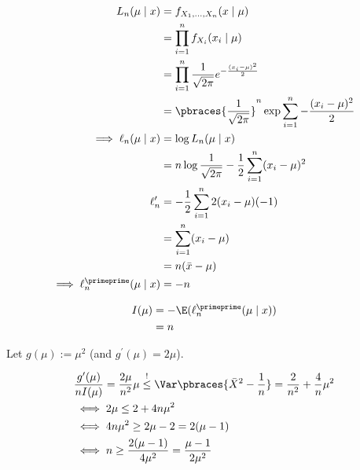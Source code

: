\begin{solution}
\begin{enumerate}[label = (\alph*)]
    \begin{align*}
        L_n(\mu \mid x)
        & =
        f_{X_1, \dots, X_n}(x \mid \mu) \\
        & =
        \prod_{i=1}^n f_{X_i}(x_i \mid \mu) \\
        & =
        \prod_{i=1}^n
            \frac{1}{\sqrt{2 \pi}}
            e^{-\frac{(x_i - \mu)^2}{2}} \\
        & =
        \pbraces
        {
            \frac{1}{\sqrt{2 \pi}}
        }^n
        \exp
            \sum_{i=1}^n
                -\frac{(x_i - \mu)^2}{2} \\
        \implies
        \ell_n(\mu \mid x)
        & =
        \log L_n(\mu \mid x) \\
        & =
        n \log \frac{1}{\sqrt{2 \pi}}
        -
        \frac{1}{2}
        \sum_{i=1}^n
            (x_i - \mu)^2 \\
        \ell_n^\prime
        & =
        -\frac{1}{2}
        \sum_{i=1}^n
            2 (x_i - \mu) (-1) \\
        & =
        \sum_{i=1}^n
            (x_i - \mu) \\
        & =
        n (\bar x - \mu) \\
        \implies
        \ell_n^\primeprime(\mu \mid x)
        & =
        -n
    \end{align*}

    \begin{align*}
        I(\mu)
        & =
        -\E(\ell_n^\primeprime(\mu \mid x)) \\
        & =
        n
    \end{align*}

    Let $g(\mu) := \mu^2$ (and $g^\prime(\mu) = 2 \mu$).

    \begin{align*}
        &
        \frac{g^\prime(\mu)}{n I(\mu)}
        =
        \frac{2 \mu}{n^2} \mu
        \stackrel{!}{\leq}
        \Var \pbraces{\bar X^2 - \frac{1}{n}}
        =
        \frac{2}{n^2} + \frac{4}{n} \mu^2 \\
        & \iff
        2 \mu \leq 2 + 4 n \mu^2 \\
        & \iff
        4 n \mu^2 \geq 2 \mu - 2 = 2 (\mu - 1) \\
        & \iff
        n \geq \frac{2 ( \mu - 1)}{4 \mu^2} = \frac{\mu - 1}{2 \mu^2}
    \end{align*}

\end{enumerate}

\end{solution}

